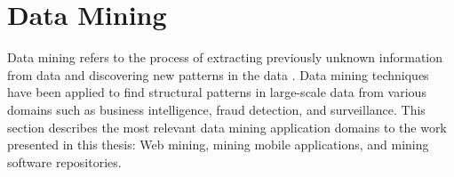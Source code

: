 \section{Data Mining}

Data mining refers to the process of extracting previously unknown information from data  and discovering new patterns in the data \cite{witten2011_data_mining_book}.
Data mining techniques have been applied to find structural patterns in large-scale data from various domains such as business intelligence, fraud detection, and surveillance.
This section describes the most relevant data mining application domains to the work presented in this thesis: Web mining, mining mobile applications, and mining software repositories.
